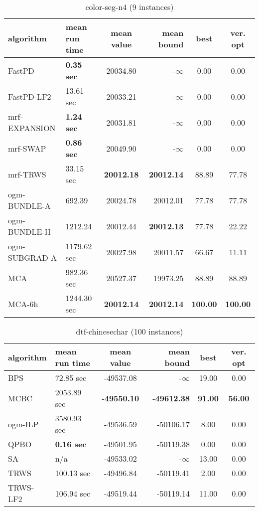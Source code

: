 \documentclass[10pt,twocolumn,letterpaper]{article}
\begin{document}
\begin{table*}
\begin{center}
\begin{tabular}{p{3.5cm}p{3cm}crcc}
  \hline
  algorithm & mean run time & mean value & mean bound & best & ver. opt \\ 
  \hline
  FastPD & {\bf 0.35 sec} & 20034.80 & -$\infty$ & 0.00 & 0.00 \\ 
  FastPD-LF2 & 13.61 sec & 20033.21 & -$\infty$ & 0.00 & 0.00 \\
  mrf-EXPANSION & {\bf 1.24 sec} & 20031.81 & -$\infty$ & 0.00 & 0.00 \\
  mrf-SWAP & {\bf 0.86 sec} & 20049.90 & -$\infty$ & 0.00 & 0.00 \\
  mrf-TRWS & 33.15 sec & {\bf 20012.18} & {\bf 20012.14} & 88.89 & 77.78 \\
  ogm-BUNDLE-A & 692.39 & 20024.78 & 20012.01 & 77.78 & 77.78 \\
  ogm-BUNDLE-H & 1212.24 & 20012.44 & {\bf 20012.13} & 77.78 & 22.22 \\
  ogm-SUBGRAD-A & 1179.62 sec & 20027.98 & 20011.57 & 66.67 & 11.11 \\
  MCA & 982.36 sec & 20527.37 & 19973.25 & 88.89 & 88.89 \\
  MCA-6h & 1244.30 sec & {\bf 20012.14} & {\bf 20012.14} & {\bf 100.00} & 
  {\bf 100.00} \\
  \hline
\end{tabular}
\end{center}
\caption{color-seg-n4 (9 instances)}
\label{tab1}
\end{table*}

\begin{table*}
\begin{center}
\begin{tabular}{p{3.5cm}p{3cm}crcc}
  \hline
  algorithm & mean run time & mean value & mean bound & best & ver. opt \\
  \hline
  BPS & 72.85 sec & -49537.08 & -$\infty$ & 19.00 & 0.00 \\
  MCBC & 2053.89 sec & -{\bf 49550.10} & -{\bf 49612.38} & {\bf 91.00} & {\bf 56.00} \\
  ogm-ILP & 3580.93 sec & -49536.59 & -50106.17 & 8.00 & 0.00 \\
  QPBO & {\bf 0.16 sec} & -49501.95 & -50119.38 & 0.00 & 0.00 \\
  SA & n/a & -49533.02 & -$\infty$ & 13.00 & 0.00 \\
  TRWS & 100.13 sec & -49496.84 & -50119.41 & 2.00 & 0.00 \\
  TRWS-LF2 & 106.94 sec & -49519.44 & -50119.14 & 11.00 & 0.00 \\
  \hline
\end{tabular}
\end{center}
\caption{dtf-chinesechar (100 instances)}
\label{tab2}
\end{table*}
\end{document}
